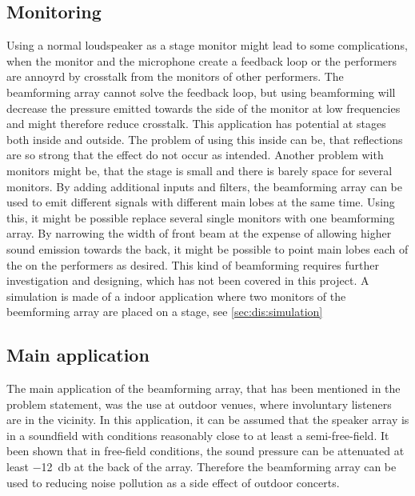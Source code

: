 \subsection{Monitoring}
Using a normal loudspeaker as a stage monitor might lead to some complications, when the monitor and the microphone create a feedback loop or the performers are annoyrd by crosstalk from the monitors of other performers. The beamforming array cannot solve the feedback loop, but using beamforming will decrease the pressure emitted towards the side of the monitor at low frequencies and might therefore reduce crosstalk. This application has potential at stages both inside and outside. The problem of using this inside can be, that reflections are so strong that the effect do not occur as intended. Another problem with monitors might be, that the stage is small and there is barely space for several monitors. By adding additional inputs and filters, the beamforming array can be used to emit different signals with different main lobes at the same time. Using this, it might be possible replace several single monitors with one beamforming array. By narrowing the width of front beam at the expense of allowing higher sound emission towards the back, it might be possible to point main lobes each of the on the performers as desired. This kind of beamforming requires further investigation and designing, which has not been covered in this project. A simulation is made of a indoor application where two monitors of the beemforming array are placed on a stage, see \autoref{sec:dis:simulation}



\subsection{Main application}
The main application of the beamforming array, that has been mentioned in the problem statement, was the use at outdoor venues, where involuntary listeners are in the vicinity. In this application, it can be assumed that the speaker array is in a soundfield with conditions reasonably close to at least a semi-free-field. It  been shown that in free-field conditions, the sound pressure can be attenuated at least \SI{-12}{\decibel} at the back of the array. Therefore the beamforming array can be used to reducing noise pollution as a side effect of outdoor concerts.


